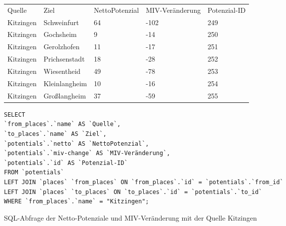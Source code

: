 \begin{tabular}{ l  l  l  l  l }
Quelle & Ziel & NettoPotenzial & MIV-Veränderung & Potenzial-ID\\ 
Kitzingen & Schweinfurt & 64 & -102 & 249\\ 
Kitzingen & Gochsheim & 9 & -14 & 250\\ 
Kitzingen & Gerolzhofen & 11 & -17 & 251\\ 
Kitzingen & Prichsenstadt & 18 & -28 & 252\\ 
Kitzingen & Wiesentheid & 49 & -78 & 253\\ 
Kitzingen & Kleinlangheim & 10 & -16 & 254\\ 
Kitzingen & Großlangheim & 37 & -59 & 255\\ 
\end{tabular} 
\newline
\newline
\begin{listing}[htbp]
\begin{verbatim}
SELECT
`from_places`.`name` AS `Quelle`, 
`to_places`.`name` AS `Ziel`, 
`potentials`.`netto` AS `NettoPotenzial`, 
`potentials`.`miv-change` AS `MIV-Veränderung`, 
`potentials`.`id` AS `Potenzial-ID`
FROM `potentials`
LEFT JOIN `places` `from_places` ON `from_places`.`id` = `potentials`.`from_id`
LEFT JOIN `places` `to_places` ON `to_places`.`id` = `potentials`.`to_id`
WHERE `from_places`.`name` = "Kitzingen";
\end{verbatim}
\caption{SQL-Abfrage der Netto-Potenziale und MIV-Veränderung mit der Quelle Kitzingen}\label{lst-fz-kitzingen}
\end{listing}